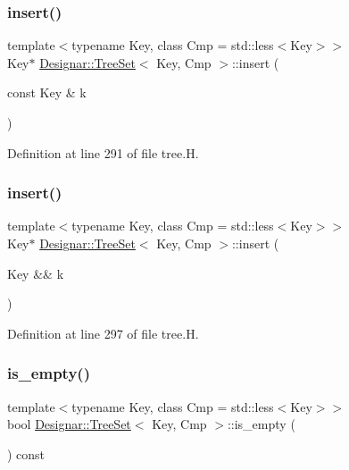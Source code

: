 \subsubsection{\texorpdfstring{insert()}{insert()}\hspace{0.1cm}{\footnotesize\ttfamily [1/2]}}
{\footnotesize\ttfamily template$<$typename Key, class Cmp = std\+::less$<$\+Key$>$$>$ \\
Key$\ast$ \hyperlink{class_designar_1_1_tree_set}{Designar\+::\+Tree\+Set}$<$ Key, Cmp $>$\+::insert (\begin{DoxyParamCaption}\item[{const Key \&}]{k }\end{DoxyParamCaption})\hspace{0.3cm}{\ttfamily [inline]}}



Definition at line 291 of file tree.\+H.

\mbox{\label{class_designar_1_1_tree_set_ae057018e4d2dd133eb7464f5fbe051de}} 
\subsubsection{\texorpdfstring{insert()}{insert()}\hspace{0.1cm}{\footnotesize\ttfamily [2/2]}}
{\footnotesize\ttfamily template$<$typename Key, class Cmp = std\+::less$<$\+Key$>$$>$ \\
Key$\ast$ \hyperlink{class_designar_1_1_tree_set}{Designar\+::\+Tree\+Set}$<$ Key, Cmp $>$\+::insert (\begin{DoxyParamCaption}\item[{Key \&\&}]{k }\end{DoxyParamCaption})\hspace{0.3cm}{\ttfamily [inline]}}



Definition at line 297 of file tree.\+H.

\mbox{\label{class_designar_1_1_tree_set_affe4342cb2019ced672a0dbf03a781b1}} 
\subsubsection{\texorpdfstring{is\+\_\+empty()}{is\_empty()}}
{\footnotesize\ttfamily template$<$typename Key, class Cmp = std\+::less$<$\+Key$>$$>$ \\
bool \hyperlink{class_designar_1_1_tree_set}{Designar\+::\+Tree\+Set}$<$ Key, Cmp $>$\+::is\+\_\+empty (\begin{DoxyParamCaption}{ }\end{DoxyParamCaption}) const\hspace{0.3cm}{\ttfamily [inline]}}



